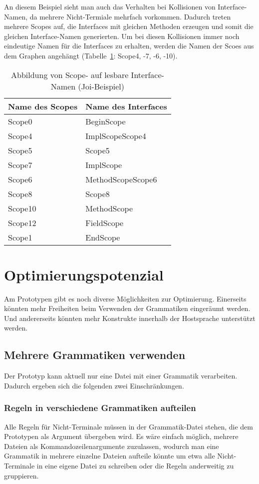 \documentclass[../InterneDSLs.tex]{subfiles}
\begin{document}
An diesem Beispiel sieht man auch das Verhalten bei Kollisionen von Interface-Namen, da mehrere Nicht-Termiale mehrfach vorkommen. Dadurch treten mehrere Scopes auf, die Interfaces mit gleichen Methoden erzeugen und somit die gleichen Interface-Namen generierten. Um bei diesen Kollisionen immer noch eindeutige Namen für die Interfaces zu erhalten, werden die Namen der Scoes aus dem Graphen angehängt (Tabelle~\ref{TAB:MappingJoiScopeToInterface}: Scope4, -7, -6, -10).
\begin{table}[ht]
\centering
\begin{tabular}{ll}
\textbf{Name des Scopes} & \textbf{Name des Interfaces}\\\hline
Scope0  & BeginScope\\
Scope4  & ImplScopeScope4\\
Scope5  & Scope5\\
Scope7  & ImplScope\\
Scope6  & MethodScopeScope6\\
Scope8  & Scope8\\
Scope10 & MethodScope\\
Scope12 & FieldScope\\
Scope1  & EndScope\\
\end{tabular}
\caption[Abbildung von Scope- auf Interfacenamen (Joi-Beispiel)]{Abbildung von Scope- auf lesbare Interface-Namen (Joi-Beispiel)}
\label{TAB:MappingJoiScopeToInterface}
\end{table}

\section{Optimierungspotenzial}
Am Prototypen gibt es noch diverse Möglichkeiten zur Optimierung. Einerseits könnten mehr Freiheiten beim Verwenden der Grammatiken eingeräumt werden. Und andererseits könnten mehr Konstrukte innerhalb der Hostsprache unterstützt werden.

\subsection{Mehrere Grammatiken verwenden}
Der Prototyp kann aktuell nur eine Datei mit einer Grammatik verarbeiten. Dadurch ergeben sich die folgenden zwei Einschränkungen.

\subsubsection{Regeln in verschiedene Grammatiken aufteilen}
Alle Regeln für Nicht-Terminale müssen in der Grammatik-Datei stehen, die dem Prototypen als Argument übergeben wird. Es wäre einfach möglich, mehrere Dateien als Kommandozeilenargumente zuzulassen, wodurch man eine Grammatik in mehrere einzelne Dateien aufteile könnte um etwa alle Nicht-Terminale in eine eigene Datei zu schreiben oder die Regeln anderweitig zu gruppieren.
\end{document}
